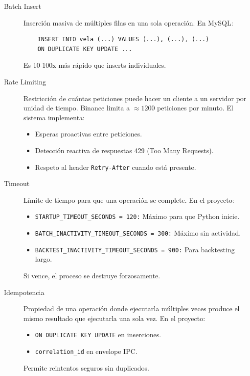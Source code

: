 \begin{description}
    \item[Batch Insert] Inserción masiva de múltiples filas en una sola operación. En MySQL:
    \begin{verbatim}
    INSERT INTO vela (...) VALUES (...), (...), (...)
    ON DUPLICATE KEY UPDATE ...
    \end{verbatim}
    Es 10-100x más rápido que inserts individuales.

    \item[Rate Limiting] Restricción de cuántas peticiones puede hacer un cliente a un servidor por unidad de tiempo. Binance limita a $\approx 1200$ peticiones por minuto. El sistema implementa:
    \begin{itemize}
        \item Esperas proactivas entre peticiones.
        \item Detección reactiva de respuestas 429 (Too Many Requests).
        \item Respeto al header \texttt{Retry-After} cuando está presente.
    \end{itemize}

    \item[Timeout] Límite de tiempo para que una operación se complete. En el proyecto:
    \begin{itemize}
        \item \texttt{STARTUP\_TIMEOUT\_SECONDS = 120:} Máximo para que Python inicie.
        \item \texttt{BATCH\_INACTIVITY\_TIMEOUT\_SECONDS = 300:} Máximo sin actividad.
        \item \texttt{BACKTEST\_INACTIVITY\_TIMEOUT\_SECONDS = 900:} Para backtesting largo.
    \end{itemize}
    Si vence, el proceso se destruye forzosamente.

    \item[Idempotencia] Propiedad de una operación donde ejecutarla múltiples veces produce el mismo resultado que ejecutarla una sola vez. En el proyecto:
    \begin{itemize}
        \item \texttt{ON DUPLICATE KEY UPDATE} en inserciones.
        \item \texttt{correlation\_id} en envelope IPC.
    \end{itemize}
    Permite reintentos seguros sin duplicados.

\end{description}



